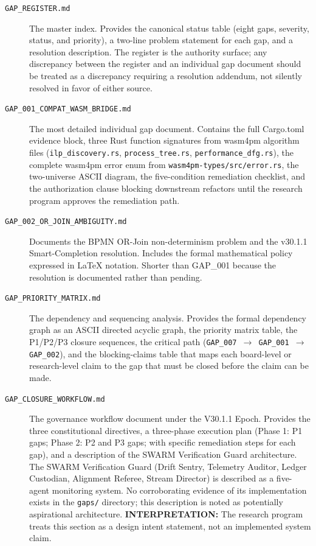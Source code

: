 \begin{description}
  \item[\texttt{GAP\_REGISTER.md}] The master index. Provides the canonical status table
        (eight gaps, severity, status, and priority), a two-line problem statement for
        each gap, and a resolution description. The register is the authority surface;
        any discrepancy between the register and an individual gap document should be
        treated as a discrepancy requiring a resolution addendum, not silently resolved
        in favor of either source.

  \item[\texttt{GAP\_001\_COMPAT\_WASM\_BRIDGE.md}] The most detailed individual gap
        document. Contains the full Cargo.toml evidence block, three Rust function
        signatures from wasm4pm algorithm files (\texttt{ilp\_discovery.rs},
        \texttt{process\_tree.rs}, \texttt{performance\_dfg.rs}), the complete wasm4pm
        error enum from \texttt{wasm4pm-types/src/error.rs}, the two-universe ASCII
        diagram, the five-condition remediation checklist, and the authorization clause
        blocking downstream refactors until the research program approves the remediation
        path.

  \item[\texttt{GAP\_002\_OR\_JOIN\_AMBIGUITY.md}] Documents the BPMN OR-Join
        non-determinism problem and the v30.1.1 Smart-Completion resolution. Includes
        the formal mathematical policy expressed in LaTeX notation. Shorter than GAP\_001
        because the resolution is documented rather than pending.

  \item[\texttt{GAP\_PRIORITY\_MATRIX.md}] The dependency and sequencing analysis.
        Provides the formal dependency graph as an ASCII directed acyclic graph, the
        priority matrix table, the P1/P2/P3 closure sequences, the critical path
        (\texttt{GAP\_007 $\rightarrow$ GAP\_001 $\rightarrow$ GAP\_002}), and the
        blocking-claims table that maps each board-level or research-level claim to the
        gap that must be closed before the claim can be made.

  \item[\texttt{GAP\_CLOSURE\_WORKFLOW.md}] The governance workflow document under the
        V30.1.1 Epoch. Provides the three constitutional directives, a three-phase
        execution plan (Phase 1: P1 gaps; Phase 2: P2 and P3 gaps; with specific
        remediation steps for each gap), and a description of the SWARM Verification
        Guard architecture. The SWARM Verification Guard (Drift Sentry, Telemetry
        Auditor, Ledger Custodian, Alignment Referee, Stream Director) is described as
        a five-agent monitoring system. No corroborating evidence of its implementation
        exists in the \texttt{gaps/} directory; this description is noted as
        potentially aspirational architecture. \textbf{INTERPRETATION:} The research
        program treats this section as a design intent statement, not an implemented
        system claim.
\end{description}

